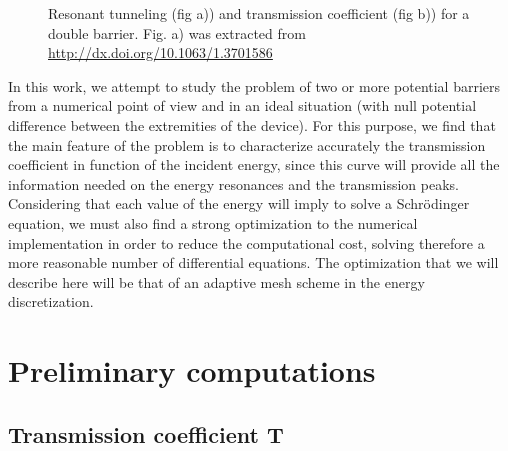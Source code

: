 \documentclass[12pt,a4paper,onecolumn]{article}
\theoremstyle{definition}
\theoremstyle{plain}
\begin{document}
\begin{figure}[h!]
\centering
	\caption{Resonant tunneling (fig a)) and transmission coefficient (fig b)) for a double barrier. Fig. a) was extracted from {\url{http://dx.doi.org/10.1063/1.3701586}}} 
	\label{fig:2barriers_problem}
\end{figure}

In this work, we attempt to study the problem of two or more potential barriers from a numerical point of view and in an ideal situation (with null potential difference between the extremities of the device). For this purpose, we find that the main feature of the problem is to characterize accurately the transmission coefficient in function of the incident energy, since this curve will provide all the information needed on the energy resonances and the transmission peaks. Considering that each value of the energy will imply to solve a Schrödinger equation, we must also find a strong optimization to the numerical implementation in order to reduce the computational cost, solving therefore a more reasonable number of differential equations. The optimization that we will describe here will be that of an adaptive mesh scheme in the energy discretization.

\section{Preliminary computations}
\subsection{Transmission coefficient \textbf{T}}
\end{document}
